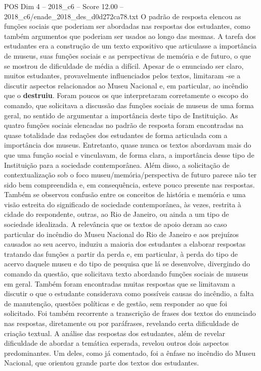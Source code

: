 \begin{textsample}{POS Dim 4 – 2018\_c6 – Score 12.00 – 2018\_c6/enade\_2018\_des\_d0d272ca78.txt}
O padrão de resposta elencou as funções sociais que poderiam ser abordadas nas respostas dos estudantes, como também argumentos que poderiam ser usados ao longo das mesmas.
A tarefa dos estudantes era a construção de um texto expositivo que articulasse a importância de museus, suas funções sociais e as perspectivas de memória e de futuro, o que se mostrou de dificuldade de média a difícil.
Apesar de o enunciado ser claro, muitos estudantes, provavelmente influenciados pelos textos, limitaram -se a discutir aspectos relacionados ao Museu Nacional e, em particular, ao incêndio que o \textbf{destruiu}.
Foram poucos os que interpretaram corretamente o escopo do comando, que solicitava a discussão das funções sociais de museus de uma forma geral, no sentido de argumentar a importância deste tipo de Instituição.
As quatro funções sociais elencadas no padrão de resposta foram encontradas na quase totalidade das redações dos estudantes de forma articulada com a importância dos museus.
Entretanto, quase nunca os textos abordavam mais do que uma função social e vinculavam, de forma clara, a importância desse tipo de Instituição para a sociedade contemporânea.
Além disso, a solicitação de contextualização sob o foco museu/memória/perspectiva de futuro parece não ter sido bem compreendida e, em consequência, esteve pouco presente nas respostas.
Também se observou confusão entre os conceitos de história e memória e uma visão estreita do significado de sociedade contemporânea, às vezes, restrita à cidade do respondente, outras, ao Rio de Janeiro, ou ainda a um tipo de sociedade idealizada.
A relevância que os textos de apoio deram ao caso particular do incêndio do Museu Nacional do Rio de Janeiro e aos prejuízos causados ao seu acervo, induziu a maioria dos estudantes a elaborar respostas tratando das funções a partir da perda e, em particular, à perda do tipo de acervo daquele museu e do tipo de pesquisa que lá se desenvolve, divergindo do comando da questão, que solicitava texto abordando funções sociais de museus em geral.
Também foram encontradas muitas respostas que se limitavam a discutir o que o estudante considerava como possíveis causas do incêndio, a falta de manutenção, questões políticas e de gestão, sem responder ao que foi solicitado.
Foi também recorrente a transcrição de frases dos textos do enunciado nas respostas, diretamente ou por paráfrases, revelando certa dificuldade de criação textual.
A análise das respostas dos estudantes, além de revelar dificuldade de abordar a temática esperada, revelou outros dois aspectos predominantes.
Um deles, como já comentado, foi a ênfase no incêndio do Museu Nacional, que orientou grande parte dos textos dos estudantes.

\end{textsample}
